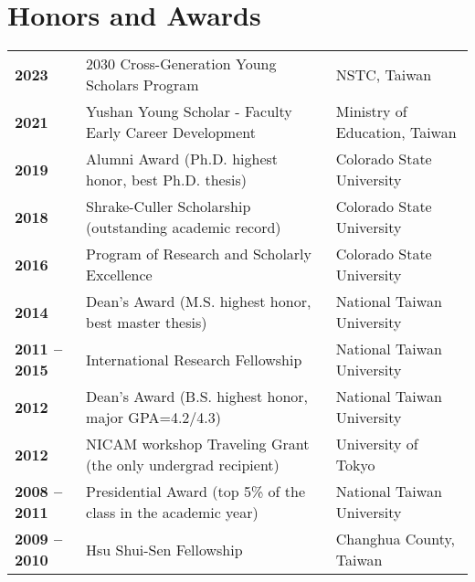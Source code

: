 \documentclass{article}
\begin{document}
\section{\color{airforceblue}Honors and Awards}
\begin{tabular}{>{\bfseries}p{2.5cm}p{10.5cm}p{\linewidth-2.5cm\relax}}
	2023   & 2030 Cross-Generation Young Scholars Program & NSTC, Taiwan
     \\ 
     2021   & Yushan Young Scholar - Faculty Early Career Development & Ministry of Education, Taiwan  
     \\ 
     2019   & Alumni Award (Ph.D. highest honor, best Ph.D. thesis) & Colorado State University 
     \\
     2018   & Shrake-Culler Scholarship (outstanding academic record) & Colorado State University 
     \\  
	 2016   & Program of Research and Scholarly Excellence & Colorado State University 
	 \\
     2014  & Dean’s Award (M.S. highest honor, best master thesis) & National Taiwan University 
     \\
     2011 -- 2015 & International Research Fellowship & National Taiwan University 
     \\
     2012        & Dean’s Award (B.S. highest honor, major GPA=4.2/4.3) & National Taiwan University  
     \\
     2012        & NICAM workshop Traveling Grant (the only undergrad recipient)  & University of Tokyo
     \\  
     2008 -- 2011 & Presidential Award (top 5\% of the class in the academic year) & National Taiwan University 
     \\

     2009 -- 2010 & Hsu Shui-Sen Fellowship   & Changhua County, Taiwan 
     
\end{tabular}
\end{document}
